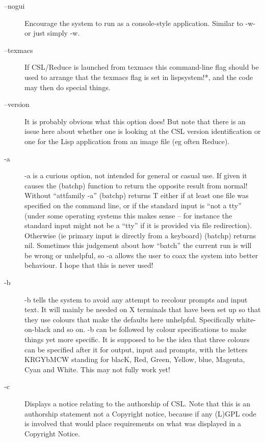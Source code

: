 \documentclass[a4paper,11pt]{article}
\begin{document}
\begin{description}
\item [{\ttfamily --nogui}] 
Encourage the system to run as a console-style application. Similar
to {\ttfamily -w-} or just simply {\ttfamily -w}.

\item [{\ttfamily --texmacs}] 
If CSL/Reduce is launched from texmacs this command-line flag should be
used to arrange that the {\ttfamily texmacs} flag is set in
{\ttfamily lispsystem!*}, and the code may then do special things.

\item [{\ttfamily --version}] 
It is probably obvious what this option does! But note that there is an
issue here about whether one is looking at the CSL version identification or
one for the Lisp application from an image file (eg often Reduce).

\item [{\ttfamily -a}] 
{\ttfamily -a} is a curious option, not intended for general or casual use.
If given it causes the {\ttfamily (batchp)} function to return the opposite
result from normal!  Without ``{attfamily -a}'' {\ttfamily (batchp)} returns
{\ttfamily T} either if at least one file was specified on the command line,
or if the standard input is ``not a tty'' (under some operating systems this
makes sense -- for instance the standard input might not be a ``tty'' if it
is provided via file redirection).  Otherwise (ie primary input is directly
from a keyboard) {\ttfamily (batchp)} returns {\ttfamily nil}.  Sometimes
this judgement about how ``batch'' the current run is will be wrong or
unhelpful, so {\ttfamily -a} allows the user to coax the system into better
behaviour.  I hope that this is never used!

\item [{\ttfamily -b}] 
{\ttfamily -b} tells the system to avoid any attempt to recolour prompts
and input text. It will mainly be needed on X terminals that have been
set up so that they use colours that make the defaults here unhelpful.
Specifically white-on-black and so on.
{\ttfamily -b} can be followed by colour specifications to make things yet
more specific. It is supposed to be the idea that three colours can be
specified after it for output, input and prompts, with the letters KRGYbMCW
standing for blacK, Red, Green, Yellow, blue, Magenta, Cyan and White.
This may not fully work yet!

\item [{\ttfamily -c}] 
Displays a notice relating to the authorship of CSL. Note that this
is an authorship statement not a Copyright notice, because if any
(L)GPL code is involved that would place requirements on what was
displayed in a Copyright Notice.


\end{description}
\end{document}
